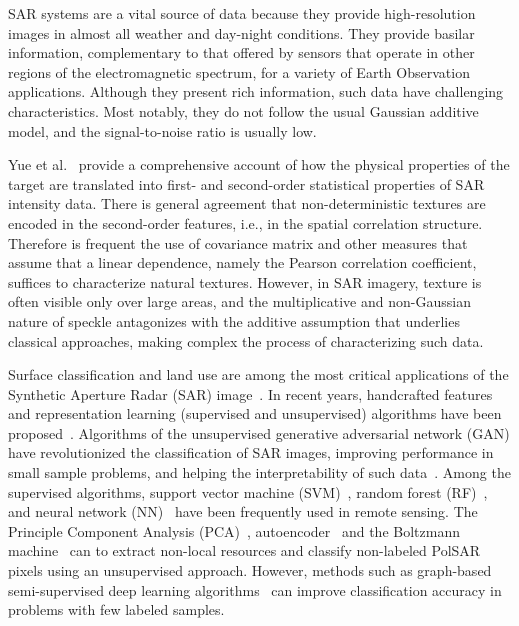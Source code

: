 \documentclass[journal]{IEEEtran}
\begin{document}
SAR systems are a vital source of data because they provide high-resolution images in almost all weather and day-night conditions.
They provide basilar information, complementary to that offered by sensors that operate in other regions of the electromagnetic spectrum, for a variety of Earth Observation applications.	
Although they present rich information, such data have challenging characteristics.
Most notably, they do not follow the usual Gaussian additive model, and the signal-to-noise ratio is usually low.

Yue et al.~\cite{Yue2020Gaussian} provide a comprehensive account of how the physical properties of the target are translated into first- and second-order statistical properties of SAR intensity data.
There is general agreement that non-deterministic textures are encoded in the second-order features, i.e., in the spatial correlation structure.
Therefore is frequent the use of covariance matrix and other measures that assume that a linear dependence, namely the Pearson correlation coefficient, suffices to characterize natural textures.
However, in SAR imagery, texture is often visible only over large areas, and the multiplicative and non-Gaussian nature of speckle antagonizes with the additive assumption that underlies classical approaches, making complex the process of characterizing such data.

Surface classification and land use are among the most critical applications of the Synthetic Aperture Radar (SAR) image~\cite{Pottier2004Unsupervised}.
In recent years, handcrafted features and representation learning (supervised and unsupervised) algorithms have been proposed~\cite{han2020unsupervised, huang2020classification, xie2020polsar}.
Algorithms of the unsupervised generative adversarial network (GAN) have revolutionized the classification of SAR images, improving performance in small sample problems, and helping the interpretability of such data~\cite{liu2019task}.
Among the supervised algorithms, support vector machine (SVM)~\cite{sukawattanavijit2017ga}, random forest (RF)~\cite{mcnairn2014early}, and neural network (NN)~\cite{lin2017deep} have been frequently used in remote sensing.
The Principle Component Analysis (PCA)~\cite{ressel2015neural}, autoencoder~\cite{wang2019classification} and the Boltzmann machine~\cite{qin2017object} can to extract non-local resources and classify non-labeled PolSAR pixels using an unsupervised approach.
However, methods such as graph-based semi-supervised deep learning algorithms~\cite{bi2018graph} can improve classification accuracy in problems with few labeled samples.
\end{document}
